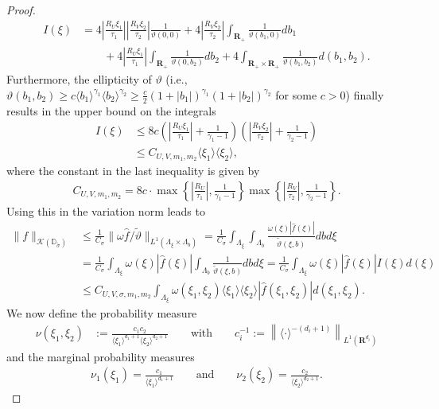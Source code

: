 \documentclass[a4paper]{article}
\newcommand{\rr}[1]{\mathbf{R}^{#1}}
\newcommand{\rrp}[1]{\mathbf{R}_+^{#1}}
\newcommand{\eabs}[1]{\langle #1\rangle}     %
\newcommand{\abs}[1]{| #1|}     %
\newcommand{\absbig}[1]{\left| #1\right|}     %
\newcommand{\norm}[2]{\|#1\|_{#2}}
\newcommand{\normbig}[2]{\left\|#1\right\|_{#2}}
\numberwithin{equation}{section}
\theoremstyle{remark}
\begin{document}
\begin{proof}
    \begin{align*}
        I(\xi)
        &=
        4\absbig{\frac{R_U\xi_1}{\tau_1}}
        \absbig{\frac{R_V\xi_2}{\tau_2}}\frac{1}{\vartheta
        \left(0,0\right)}
        +4\absbig{\frac{R_V\xi_2}{\tau_2}}
        \int_{\rrp{}}\frac{1}{\vartheta\left(b_1,0\right)}db_1
        \\
        &\qquad+4\absbig{\frac{R_U\xi_1}{\tau_1}}
        \int_{\rrp{}}\frac{1}{\vartheta\left(0,b_2\right)}db_2
        +4\int_{\rrp{}\times\rrp{}}\frac{1}{\vartheta
        \left(b_1,b_2\right)}d(b_1,b_2).
    \end{align*}
    Furthermore, the ellipticity of $\vartheta$
    (i.e., $\vartheta(b_1,b_2)\geq c\eabs{b_1}^{\gamma_1}\eabs{b_2}^{\gamma_2}\geq \frac{c}{2}(1+\abs{b_1})^{\gamma_1}(1+\abs{b_2})^{\gamma_2}$ for some $c>0$)
    finally results in the upper bound on the integrals
    \begin{align*}
        I(\xi)
        &\leq
        8c\left(\absbig{\frac{R_U\xi_1}{\tau_1}}+\frac{1}{\gamma_1-1}\right)
        \left(\absbig{\frac{R_V\xi_2}{\tau_2}}+\frac{1}{\gamma_2-1}\right)
        \\
        &\leq C_{U,V,m_1,m_2}\eabs{\xi_1}\eabs{\xi_2},
    \end{align*}
    where the constant in the last inequality is given by
    \begin{align*}
        C_{U,V,m_1,m_2}
        =
        8c\cdot\max\left\{\absbig{\frac{R_U}{\tau_1}},\frac{1}{\gamma_1-1}\right\}
        \max\left\{\absbig{\frac{R_V}{\tau_2}},\frac{1}{\gamma_2-1}\right\}.
    \end{align*}
    Using this in the variation norm leads to
    \begin{align*}
        \norm{f}{\mathcal{K}(\mathbb{D}_{\tilde{\sigma}})}
            &\leq\frac{1}{C_\sigma}\norm{\omega\hat{f}/\tilde{\vartheta}}{L^1(\Lambda_\xi\times\Lambda_b)}
            =\frac{1}{C_\sigma}\int_{\Lambda_\xi}\int_{\Lambda_b}\frac{\omega(\xi)\abs{\hat{f}(\xi)}}
                    {\tilde{\vartheta}(\xi,b)} db d\xi
        \\
        &=\frac{1}{C_{\sigma}}
            \int_{\Lambda_\xi}\omega(\xi)\abs{\hat{f}(\xi)}
            \int_{\Lambda_b}\frac{1}{\tilde{\vartheta}\left(\xi,b\right)}d b d \xi
        =\frac{1}{C_{\sigma}}
            \int_{\Lambda_\xi}\omega(\xi)\abs{\hat{f}(\xi)}I(\xi)d(\xi)\\
        &\leq C_{U,V,\sigma,m_1,m_2}
            \int_{\Lambda_\xi}\omega(\xi_1,\xi_2)\eabs{\xi_1}\eabs{\xi_2}\abs{\hat{f}(\xi_1,\xi_2)}d(\xi_1,\xi_2).
    \end{align*}
    We now define the probability measure
    \begin{align*}
        \nu(\xi_1,\xi_2)&:=\frac{c_1c_2}{\eabs{\xi_1}^{d_1+1}\eabs{\xi_2}^{d_2+1}}
    \qquad\text{with}\qquad
        c_i^{-1}:=\normbig{\eabs{\cdot}^{-(d_i+1)}}{L^1(\rr{d_i})}
    \end{align*}
    and the marginal probability measures
    \begin{align*}
        \nu_1(\xi_1)=\frac{c_1}{\eabs{\xi_1}^{d_1+1}}
        \qquad\text{and}\qquad
        \nu_2(\xi_2)=\frac{c_2}{\eabs{\xi_2}^{d_2+1}}.
    \end{align*}
    

\end{proof}
\end{document}
